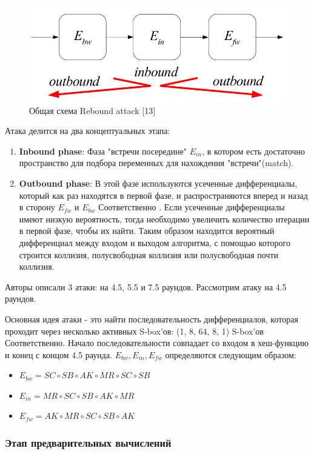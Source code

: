 \documentclass[colorthm]{./civarticle}
\begin{document}
\begin{figure}[H]
    \centering
    \includegraphics[width=0.5\linewidth]{rebound.png}
    \caption{Общая схема Rebound attack [13]}
    \label{fig:enter-label}
\end{figure}

Атака делится на два концептуальных этапа:

\begin{enumerate}
    \item \textbf{Inbound phase}: Фаза "встречи посередине" $E_{in}$, в котором есть достаточно пространство для подбора переменных для нахождения "встречи"(match).
    \item \textbf{Outbound phase}: В этой фазе используются усеченные дифференциалы, который как раз находятся в первой фазе, и распространяются вперед и назад в сторону $E_{fw}$ и $E_{bw}$ Соответственно . Если усеченные дифференциалы имеют низкую вероятность, тогда необходимо увеличить количество итерации в первой фазе, чтобы их найти. Таким образом находится вероятный дифференциал между входом и выходом алгоритма, с помощью которого строится коллизия, полусвободная коллизия или полусвободная почти коллизия.
\end{enumerate}

Авторы описали 3 атаки: на 4.5, 5.5 и 7.5 раундов. Рассмотрим атаку на 4.5 раундов.

Основная идея атаки - это найти последовательность дифференциалов, которая проходит через несколько активных S-box'ов: (1, 8, 64, 8, 1) S-box'ов Соответственно. Начало последовательности совпадает со входом в хеш-функцию и конец с концом 4.5 раунда. $E_{bw}, E_{in}, E_{fw}$ определяются следующим образом:

\begin{itemize}
    \item $E_{bw} = SC \circ SB \circ AK \circ MR \circ SC \circ SB$
    \item $E_{in} = MR \circ SC \circ SB \circ AK \circ MR$
    \item $E_{fw} = AK \circ MR \circ SC \circ SB \circ AK$
\end{itemize}

\subsubsection{Этап предварительных вычислений}
\end{document}
